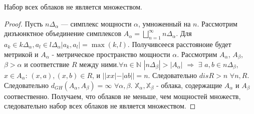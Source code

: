 \begin{theorem}
   Набор всех облаков не является множеством.
\end{theorem}
\begin{proof}
Пусть $n\Delta_\alpha$ --- симплекс мощности $\alpha$, умноженный на $n$. Рассмотрим дизъюнктное
объединение симплексов $A_\alpha = \bigsqcup_{n=1}^\infty n\Delta_\alpha$. Для
$a_k \in k\Delta_\alpha, a_l \in l\Delta_\alpha |a_k, a_l| = \max(k, l)$.
Получивсееся расстояноие будет метрикой и $A_\alpha$ - метрическое пространство
мощности $\alpha$. Рассмотрим $A_\alpha$, $A_\beta$, $\beta>\alpha$ и
соответствие $R$ между ними.$\forall n\in \mathbb{N}$
$|n\Delta_\beta| > |A_\alpha|$ $\Rightarrow$ $\exists$
$a, b \in n\Delta_\beta$, $x\in A_\alpha$: $(x,a), (x,b) \in R$, и
$||xx| - |ab|| = n$. Следовательно $disR > n$ $\forall n, R$. Следовательно
$d_{GH}(A_\alpha, A_\beta) = \infty$ $\forall \alpha, \beta$.
$\mathbb{X}_\alpha, \mathbb{X}_\beta$ - облака, содержащие $A_\alpha$ и
$A_\beta$ соотвественно. Получаем, что облаков не меньше, чем мощностей
множеств, следовательно набор всех облаков не является множеством.

\end{proof}
